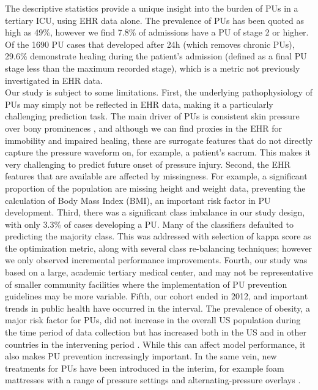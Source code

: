 \documentclass{ws-procs11x85}
\begin{document}
\noindent
The descriptive statistics provide a unique insight into the burden of PUs in a tertiary ICU, using EHR data alone. The prevalence of PUs has been quoted as high as 49\%, however we find 7.8\% of admissions have a PU of stage 2 or higher. Of the 1690 PU cases that developed after 24h (which removes chronic PUs), 29.6\% demonstrate healing during the patient's admission (defined as a final PU stage less than the maximum recorded stage), which is a metric not previously investigated in EHR data.
\\

\noindent
Our study is subject to some limitations. First, the underlying pathophysiology of PUs may simply not be reflected in EHR data, making it a particularly challenging prediction task. The main driver of PUs is consistent skin pressure over bony prominences \cite{cox}, and although we can find proxies in the EHR for immobility and impaired healing, these are surrogate features that do not directly capture the pressure waveform on, for example, a patient's sacrum. This makes it very challenging to predict future onset of pressure injury. Second, the EHR features that are available are affected by missingness. For example, a significant proportion of the population are missing height and weight data, preventing the calculation of Body Mass Index (BMI), an important risk factor in PU development. Third, there was a significant class imbalance in our study design, with only 3.3\% of cases developing a PU. Many of the classifiers defaulted to predicting the majority class. This was addressed with selection of kappa score as the optimization metric, along with several class re-balancing techniques; however we only observed incremental performance improvements. Fourth, our study was based on a large, academic tertiary medical center, and may not be representative of smaller community facilities where the implementation of PU prevention guidelines may be more variable. Fifth, our cohort ended in 2012, and important trends in public health have occurred in the interval. The prevalence of obesity, a major risk factor for PUs, did not increase in the overall US population during the time period of data collection \cite{pmid22253363} but has increased both in the US and in other countries in the intervening period \cite{pmid30155850}. While this can affect model performance, it also makes PU prevention increasingly important. In the same vein, new treatments for PUs have been introduced in the interim, for example foam mattresses with a range of pressure settings and alternating-pressure overlays \cite{pmid30307602}. 
\\
\end{document}
